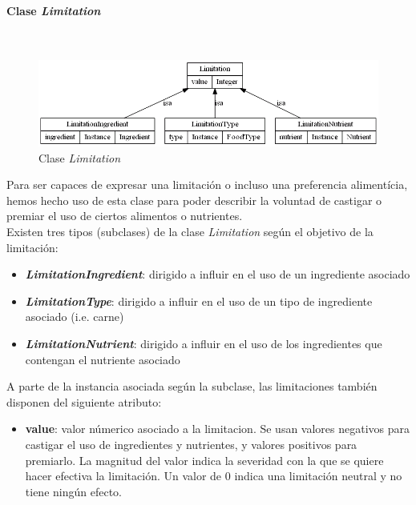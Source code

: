 \documentclass[11]{article}
\begin{document}
\paragraph{Clase \emph{Limitation}}\mbox{}\\
\begin{figure}[H]
\centering
\includegraphics[scale=0.5]{images/class_Limitation.png}
\caption{Clase \emph{Limitation}}
\label{fig_class_Limitation}
\end{figure}

Para ser capaces de expresar una limitación o incluso una preferencia alimentícia, hemos hecho uso de esta clase para poder describir la voluntad de castigar o premiar el uso de ciertos alimentos o nutrientes.
\\

Existen tres tipos (subclases) de la clase \emph{Limitation} según el objetivo de la limitación:
\begin{itemize}
\item \emph{\textbf{LimitationIngredient}}: dirigido a influir en el uso de un ingrediente asociado
\item \emph{\textbf{LimitationType}}: dirigido a influir en el uso de un tipo de ingrediente asociado (i.e. carne)
\item \emph{\textbf{LimitationNutrient}}: dirigido a influir en el uso de los ingredientes que contengan el nutriente asociado

\end{itemize}

A parte de la instancia asociada según la subclase, las limitaciones también disponen del siguiente atributo:
\begin{itemize}
\item \textbf{value}: valor númerico asociado a la limitacion. Se usan valores negativos para castigar el uso de ingredientes y nutrientes, y valores positivos para premiarlo. La magnitud del valor indica la severidad con la que se quiere hacer efectiva la limitación. Un valor de 0 indica una limitación neutral y no tiene ningún efecto. 
\end{itemize}
\end{document}
